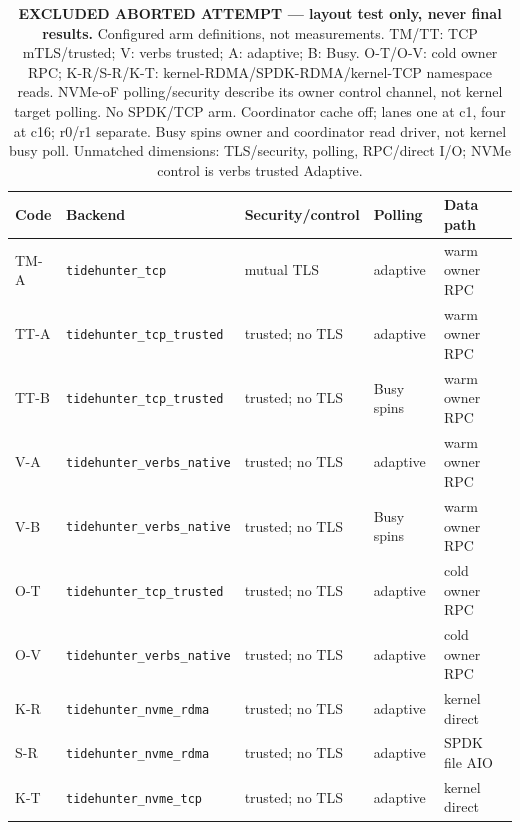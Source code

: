 \begin{table}[H]\centering\small\setlength{\tabcolsep}{3pt}
\begin{tabular}{lllll}\toprule
Code & Backend & Security/control & Polling & Data path\\\midrule
TM-A & \texttt{tidehunter\_tcp} & mutual TLS & adaptive & warm owner RPC\\
TT-A & \texttt{tidehunter\_tcp\_trusted} & trusted; no TLS & adaptive & warm owner RPC\\
TT-B & \texttt{tidehunter\_tcp\_trusted} & trusted; no TLS & Busy spins & warm owner RPC\\
V-A & \texttt{tidehunter\_verbs\_native} & trusted; no TLS & adaptive & warm owner RPC\\
V-B & \texttt{tidehunter\_verbs\_native} & trusted; no TLS & Busy spins & warm owner RPC\\
O-T & \texttt{tidehunter\_tcp\_trusted} & trusted; no TLS & adaptive & cold owner RPC\\
O-V & \texttt{tidehunter\_verbs\_native} & trusted; no TLS & adaptive & cold owner RPC\\
K-R & \texttt{tidehunter\_nvme\_rdma} & trusted; no TLS & adaptive & kernel direct\\
S-R & \texttt{tidehunter\_nvme\_rdma} & trusted; no TLS & adaptive & SPDK file AIO\\
K-T & \texttt{tidehunter\_nvme\_tcp} & trusted; no TLS & adaptive & kernel direct\\
\bottomrule\end{tabular}
\caption{\textbf{EXCLUDED ABORTED ATTEMPT --- layout test only, never final results.} Configured arm definitions, not measurements. TM/TT: TCP mTLS/trusted; V: verbs trusted; A: adaptive; B: Busy. O-T/O-V: cold owner RPC; K-R/S-R/K-T: kernel-RDMA/SPDK-RDMA/kernel-TCP namespace reads. NVMe-oF polling/security describe its owner control channel, not kernel target polling. No SPDK/TCP arm. Coordinator cache off; lanes one at c1, four at c16; r0/r1 separate. Busy spins owner and coordinator read driver, not kernel busy poll. Unmatched dimensions: TLS/security, polling, RPC/direct I/O; NVMe control is verbs trusted Adaptive.}
\end{table}
